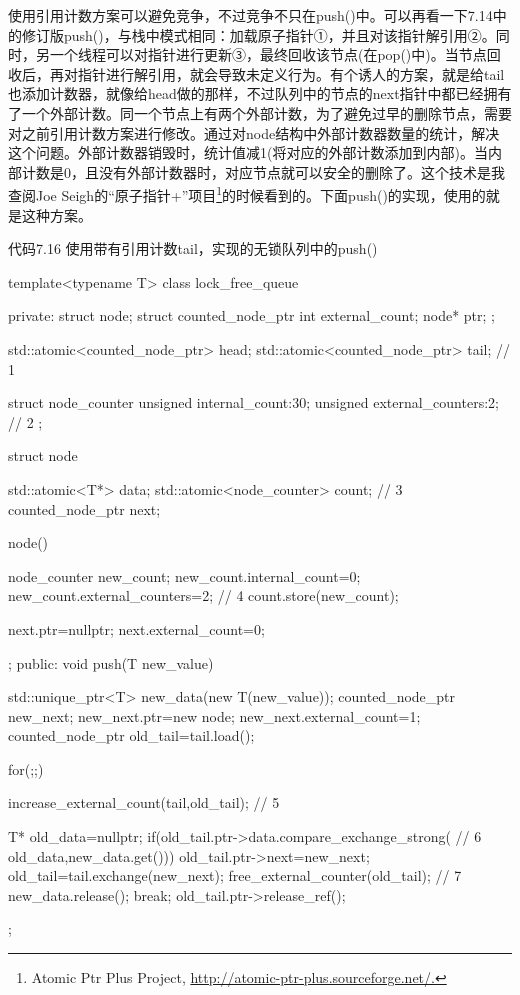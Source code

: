 使用引用计数方案可以避免竞争，不过竞争不只在push()中。可以再看一下7.14中的修订版push()，与栈中模式相同：加载原子指针①，并且对该指针解引用②。同时，另一个线程可以对指针进行更新③，最终回收该节点(在pop()中)。当节点回收后，再对指针进行解引用，就会导致未定义行为。有个诱人的方案，就是给tail也添加计数器，就像给head做的那样，不过队列中的节点的next指针中都已经拥有了一个外部计数。同一个节点上有两个外部计数，为了避免过早的删除节点，需要对之前引用计数方案进行修改。通过对node结构中外部计数器数量的统计，解决这个问题。外部计数器销毁时，统计值减1(将对应的外部计数添加到内部)。当内部计数是0，且没有外部计数器时，对应节点就可以安全的删除了。这个技术是我查阅Joe Seigh的“原子指针+”项目\footnote[5]{Atomic Ptr Plus Project, \url{http://atomic-ptr-plus.sourceforge.net/.}}的时候看到的。下面push()的实现，使用的就是这种方案。

代码7.16 使用带有引用计数tail，实现的无锁队列中的push()

\begin{cpp}
template<typename T>
class lock_free_queue
{
private:
  struct node;
  struct counted_node_ptr
  {
    int external_count;
    node* ptr;
  };

  std::atomic<counted_node_ptr> head;
  std::atomic<counted_node_ptr> tail;  // 1

  struct node_counter
  {
    unsigned internal_count:30;
    unsigned external_counters:2;  // 2
  };

  struct node
  {
    std::atomic<T*> data;
    std::atomic<node_counter> count;  // 3
    counted_node_ptr next;

    node()
    {
      node_counter new_count;
      new_count.internal_count=0;
      new_count.external_counters=2;  // 4
      count.store(new_count);

      next.ptr=nullptr;
      next.external_count=0;
     }
  };
public:
  void push(T new_value)
  {
    std::unique_ptr<T> new_data(new T(new_value));
    counted_node_ptr new_next;
    new_next.ptr=new node;
    new_next.external_count=1;
    counted_node_ptr old_tail=tail.load();

    for(;;)
    {
      increase_external_count(tail,old_tail);  // 5

      T* old_data=nullptr;
      if(old_tail.ptr->data.compare_exchange_strong(  // 6
           old_data,new_data.get()))
      {
        old_tail.ptr->next=new_next;
        old_tail=tail.exchange(new_next);
        free_external_counter(old_tail);  // 7
        new_data.release();
        break;
      }
      old_tail.ptr->release_ref();
    }
  }
};
\end{cpp}

